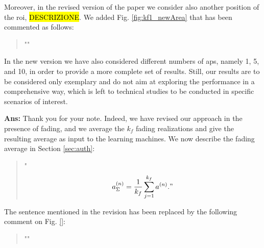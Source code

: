 \documentclass[draftcls,onecolumn,12pt]{IEEEtran}
\newcounter{revc}
\newcommand{\revp}[1]{\zref[revcontent]{#1}}
\begin{document}
Moreover, in the revised version of the paper we consider also another position of the \ac{roi}, \hl{DESCRIZIONE}. We added Fig. \ref{fig:kf1_newArea} that has been commented as follows:
\begin{quote}
"\revp{revnewarea}"
\end{quote}

In the new version we have also considered different numbers of \acp{ap}, namely 1, 5, and 10, in order to provide a more complete set of results. Still, our results are to be considered only exemplary and do not aim at exploring the performance in a comprehensive way, which is left to technical studies to be conducted in specific scenarios of interest.

\vspace{5mm} %
\begin{framed}
\end{framed}

{\bf Ans:} Thank you for your note. Indeed, we have revised our approach in the presence of fading, and we average the $k_f$ fading realizations and give the resulting average as input to the learning machines. We now describe the fading average in Section \ref{sec:auth}:
\begin{quote}
    "\revp{avg_1}
$$
a^{(n)}_{\Sigma} = \frac{1}{k_f}\sum_{j=1}^{k_f} a^{(n)}."
$$
\end{quote}

The sentence mentioned in the revision has been replaced by the following comment on Fig. \ref{}:
\begin{quote}
    "\revp{rev2fad}"
\end{quote}

\vspace{5mm} %
\begin{framed}
\end{framed}
\end{document}
